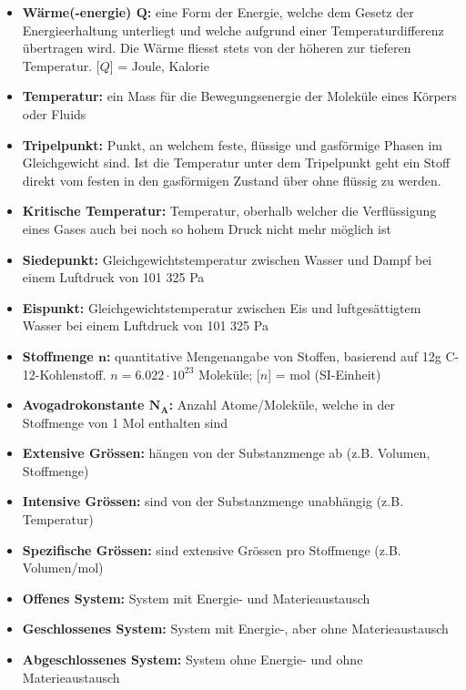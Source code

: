 		\begin{minipage}{18cm}
			\begin{itemize}
				\item \textbf{Wärme(-energie) $\boldsymbol{Q}$:} eine Form der Energie, welche dem Gesetz der Energieerhaltung unterliegt und welche aufgrund einer Temperaturdifferenz übertragen wird. Die Wärme fliesst stets von der höheren zur tieferen Temperatur. [$Q$] = Joule, Kalorie
				\item \textbf{Temperatur:} ein Mass für die Bewegungsenergie der Moleküle eines Körpers oder Fluids
				\item \textbf{Tripelpunkt:} Punkt, an welchem feste, flüssige und gasförmige Phasen im Gleichgewicht sind. Ist die Temperatur unter dem Tripelpunkt geht ein Stoff direkt vom festen in den gasförmigen Zustand über ohne flüssig zu werden. \label{Tripelpunkt}
				\item \textbf{Kritische Temperatur:} Temperatur, oberhalb welcher die Verflüssigung eines Gases auch bei noch so hohem Druck nicht mehr möglich ist \label{KritischTemperatur}
				\item \textbf{Siedepunkt:} Gleichgewichtstemperatur zwischen Wasser und Dampf bei einem Luftdruck von 101 325 Pa
				\item \textbf{Eispunkt:} Gleichgewichtstemperatur zwischen Eis und luftgesättigtem Wasser bei einem Luftdruck von 101 325 Pa
				\item \textbf{Stoffmenge $\boldsymbol{n}$:} quantitative Mengenangabe von Stoffen, basierend auf 12g C-12-Kohlenstoff. $n = 6.022 \cdot 10^{23}$ Moleküle; [$n$] = mol (SI-Einheit)
				\item \textbf{Avogadrokonstante $\boldsymbol{N_A}$:} Anzahl Atome/Moleküle, welche in der Stoffmenge von 1 Mol enthalten sind
				\item \textbf{Extensive Grössen:} hängen von der Substanzmenge ab (z.B. Volumen, Stoffmenge)
				\item \textbf{Intensive Grössen:} sind von der Substanzmenge unabhängig (z.B. Temperatur)
				\item \textbf{Spezifische Grössen:} sind extensive Grössen pro Stoffmenge (z.B. Volumen/mol)
				\item \textbf{Offenes System:} System mit Energie- und Materieaustausch
				\item \textbf{Geschlossenes System:} System mit Energie-, aber ohne Materieaustausch
				\item \textbf{Abgeschlossenes System:} System ohne Energie- und ohne Materieaustausch

\end{itemize}
\end{minipage}
